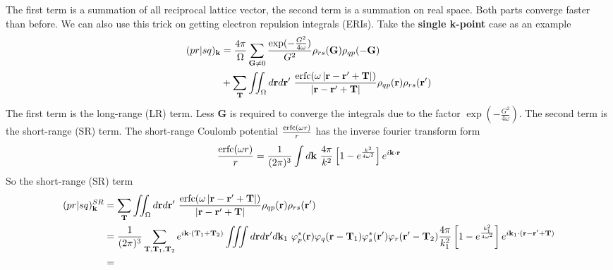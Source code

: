 \documentclass{article}
\begin{document}
            The first term is a summation of all reciprocal lattice vector,
            the second term is a summation on real space.
            Both parts converge faster than before.
            We can also use this trick on getting electron repulsion integrals (ERIs).
            Take the \textbf{single k-point} case as an example
            \begin{align}
                (pr|sq)_{\textbf{k}} &= \frac{4\pi}{\Omega}\sum_{\textbf{G}\neq 0}
                \frac{\exp(-\frac{G^2}{4\omega})}{G^2}\rho_{rs}(\textbf{G})\rho_{qp}(-\textbf{G})\notag\\
                &+ \sum_{\textbf{T}}\iint_{\Omega}d\textbf{r}d\textbf{r}'\ 
                \frac{{\rm erfc}(\omega\left|\textbf{r}-\textbf{r}'+\textbf{T}\right|)}{\left|\textbf{r}-\textbf{r}'+\textbf{T}\right|}
                \rho_{qp}(\textbf{r})\rho_{rs}(\textbf{r}')
            \end{align}
            The first term is the long-range (LR) term.
            Less $\textbf{G}$ is required to converge the integrals due to the factor $\exp(-\frac{G^2}{4\omega})$.
            The second term is the short-range (SR) term.
            The short-range Coulomb potential $\frac{{\rm erfc}(\omega r)}{r}$ has the inverse fourier transform form
            \begin{equation}
                \frac{{\rm erfc}(\omega r)}{r} = \frac{1}{(2\pi)^3}\int d\textbf{k}\ \frac{4\pi}{k^2}\left[1-e^{\frac{k^2}{4\omega^2}}\right]e^{i\textbf{k}\cdot\textbf{r}}
            \end{equation}
            So the short-range (SR) term 
            \begin{align}
                (pr|sq)_{\textbf{k}}^{SR} &= \sum_{\textbf{T}}\iint_{\Omega}d\textbf{r}d\textbf{r}'\ 
                \frac{{\rm erfc}(\omega\left|\textbf{r}-\textbf{r}'+\textbf{T}\right|)}{\left|\textbf{r}-\textbf{r}'+\textbf{T}\right|}
                \rho_{qp}(\textbf{r})\rho_{rs}(\textbf{r}')\notag\\
                &= \frac{1}{(2\pi)^3}\sum_{\textbf{T},\textbf{T}_1,\textbf{T}_2}e^{i\textbf{k}\cdot(\textbf{T}_1+\textbf{T}_2)}
                \iiint d\textbf{r}d\textbf{r}'d\textbf{k}_1\ \varphi_p^*(\textbf{r})\varphi_q(\textbf{r}-\textbf{T}_1)
                \varphi_s^*(\textbf{r}')\varphi_r(\textbf{r}'-\textbf{T}_2)
                \frac{4\pi}{k_1^2}\left[1-e^{\frac{k_1^2}{4\omega^2}}\right]e^{i\textbf{k}_1\cdot(\textbf{r}-\textbf{r}'+\textbf{T})}\notag\\
                &= 
            \end{align}
            
\end{document}
